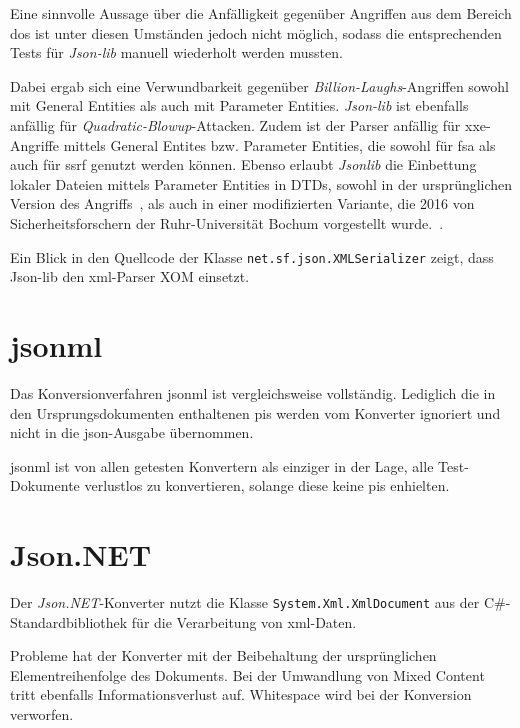 Eine sinnvolle Aussage über die Anfälligkeit gegenüber Angriffen aus dem Bereich \acrlong{dos} ist unter diesen Umständen jedoch nicht möglich, sodass die entsprechenden Tests für \emph{Json-lib} manuell wiederholt werden mussten.

Dabei ergab sich eine Verwundbarkeit gegenüber \emph{Billion-Laughs}-Angriffen sowohl mit General Entities als auch mit Parameter Entities. \emph{Json-lib} ist ebenfalls anfällig für \emph{Quadratic\hyp{}Blowup}\hyp{}Attacken. Zudem ist der Parser anfällig für \acrshort{xxe}-Angriffe mittels General Entites bzw. Parameter Entities, die sowohl für \acrlong{fsa} als auch für \acrlong{ssrf} genutzt werden können.
Ebenso erlaubt \emph{Jsonlib} die Einbettung lokaler Dateien mittels Parameter Entities in DTDs, sowohl in der ursprünglichen Version des Angriffs~\cite[S.~10]{morgan2014xml}, als auch in einer modifizierten Variante, die 2016 von Sicherheitsforschern der Ruhr-Universität Bochum vorgestellt wurde.~\cite[Abschn.~5.2]{spaeth2016sok}.

Ein Blick in den Quellcode der Klasse \texttt{net.sf.json.XMLSerializer} zeigt, dass Json-lib den \acrshort{xml}-Parser XOM einsetzt.

\section{\acrshort{jsonml}}
\label{sec:jsonml}

Das Konversionverfahren \acrshort{jsonml} ist vergleichsweise vollständig. Lediglich die in den Ursprungsdokumenten enthaltenen \glspl{pi} werden vom Konverter ignoriert und nicht in die \acrshort{json}-Ausgabe übernommen.

\acrshort{jsonml} ist von allen getesten Konvertern als einziger in der Lage, alle Test-Dokumente verlustlos zu konvertieren, solange diese keine \glspl{pi} enhielten.

\section{Json.NET}
\label{sec:jsondotnet}

Der \emph{Json.NET}-Konverter nutzt die Klasse \texttt{System.Xml.XmlDocument} aus der C\#\hyp{}Standardbibliothek für die Verarbeitung von \acrshort{xml}-Daten.

Probleme hat der Konverter mit der Beibehaltung der ursprünglichen Elementreihenfolge des Dokuments. Bei der Umwandlung von Mixed Content tritt ebenfalls Informationsverlust auf. Whitespace wird bei der Konversion verworfen.

